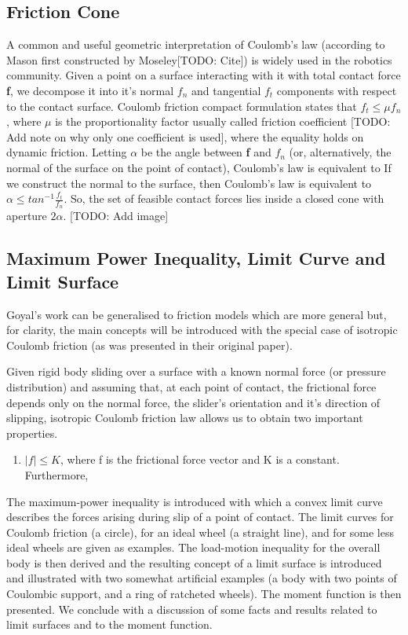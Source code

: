 \documentclass[12,twoside]{TFG-GM}
\theoremstyle{definition}
\theoremstyle{remark}
\begin{document}
\subsection{Friction Cone}
\label{subsec:frictioncone}
A common and useful geometric interpretation of Coulomb’s law (according to Mason first constructed by Moseley[TODO: Cite]) is widely used in the robotics community. Given a point on a surface interacting with it with total contact force \textbf{f}, we decompose it into it's normal $f_n$ and tangential $f_t$ components with respect to the contact surface. Coulomb friction compact formulation states that $f_t \leq \mu f_n$, where $\mu$ is the proportionality factor usually called friction coefficient [TODO: Add note on why only one coefficient is used], where the equality holds on dynamic friction. Letting $\alpha$ be the angle between \textbf{f} and $f_n$ (or, alternatively, the normal of the surface on the point of contact), Coulomb's law is equivalent to 
If we construct the normal to the surface, then Coulomb’s law is equivalent to $\alpha \leq tan^{-1} \frac{f_t}{f_n}$. So, the set of feasible contact forces lies inside a closed cone with aperture $2\alpha$. [TODO: Add image]

\subsection{Maximum Power Inequality, Limit Curve and Limit Surface}
\label{subsec:mpi}
Goyal's work can be generalised to friction models which are more general but, for clarity, the main concepts will be introduced with the special case of isotropic Coulomb friction (as was presented in their original paper).

Given rigid body sliding over a surface with a known normal force (or pressure distribution) and assuming that, at each point of contact, the frictional force depends only on the normal force, the slider's orientation and it's direction of slipping, isotropic Coulomb friction law allows us to obtain two important properties.
\begin{enumerate}
\item $|f| \leq K$, where f is the frictional force vector and K is a constant. Furthermore,
\end{enumerate}

The maximum-power inequality is introduced with which a convex limit curve describes the forces arising during slip of a point of contact. The limit curves for Coulomb friction (a circle), for an ideal wheel (a straight line), and for some less ideal wheels are given as examples. The load-motion inequality for the overall body is then derived and the resulting concept of a limit surface is introduced and illustrated with two somewhat artificial examples (a body with two points of Coulombic support, and a ring of ratcheted wheels). The moment function is then presented. We conclude with a discussion of some facts and results related to limit surfaces and to the moment function.
\end{document}
